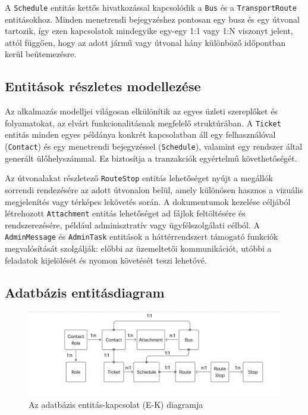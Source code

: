 A \texttt{Schedule} entitás kettős hivatkozással kapcsolódik a \texttt{Bus} és a \texttt{TransportRoute} entitásokhoz. Minden menetrendi bejegyzéshez pontosan egy busz és egy útvonal tartozik, így ezen kapcsolatok mindegyike egy-egy 1:1 vagy 1:N viszonyt jelent, attól függően, hogy az adott jármű vagy útvonal hány különböző időpontban kerül beütemezésre.

\subsection{Entitások részletes modellezése}

Az alkalmazás modelljei világosan elkülönítik az egyes üzleti szereplőket és folyamatokat, az elvárt funkcionalitásnak megfelelő struktúrában. A \texttt{Ticket} entitás minden egyes példánya konkrét kapcsolatban áll egy felhasználóval (\texttt{Contact}) és egy menetrendi bejegyzéssel (\texttt{Schedule}), valamint egy rendszer által generált ülőhelyszámmal. Ez biztosítja a tranzakciók egyértelmű követhetőségét.

Az útvonalakat részletező \texttt{RouteStop} entitás lehetőséget nyújt a megállók sorrendi rendezésére az adott útvonalon belül, amely különösen hasznos a vizuális megjelenítés vagy térképes lekövetés során. A dokumentumok kezelése céljából létrehozott \texttt{Attachment} entitás lehetőséget ad fájlok feltöltésére és rendszerezésére, például adminisztratív vagy ügyfélszolgálati célból. A \texttt{AdminMessage} és \texttt{AdminTask} entitások a háttérrendszert támogató funkciók megvalósítását szolgálják: előbbi az üzemeltetői kommunikációt, utóbbi a feladatok kijelölését és nyomon követését teszi lehetővé.

\subsection{Adatbázis entitásdiagram}

\begin{figure}[H]
    \centering
    \includegraphics[width=1\textwidth]{Szakdolgozat/Mellekletek/ERdiagram.PNG}
    

    \caption{Az adatbázis entitás-kapcsolat (E-K) diagramja}
    \label{fig:er-diagram}
\end{figure}

